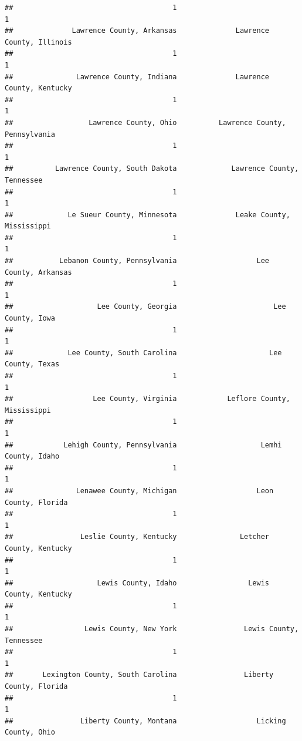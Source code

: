 \documentclass[
]{article}
\begin{document}
\begin{verbatim}
##                                      1                                      1 
##              Lawrence County, Arkansas              Lawrence County, Illinois 
##                                      1                                      1 
##               Lawrence County, Indiana              Lawrence County, Kentucky 
##                                      1                                      1 
##                  Lawrence County, Ohio          Lawrence County, Pennsylvania 
##                                      1                                      1 
##          Lawrence County, South Dakota             Lawrence County, Tennessee 
##                                      1                                      1 
##             Le Sueur County, Minnesota              Leake County, Mississippi 
##                                      1                                      1 
##           Lebanon County, Pennsylvania                   Lee County, Arkansas 
##                                      1                                      1 
##                    Lee County, Georgia                       Lee County, Iowa 
##                                      1                                      1 
##             Lee County, South Carolina                      Lee County, Texas 
##                                      1                                      1 
##                   Lee County, Virginia            Leflore County, Mississippi 
##                                      1                                      1 
##            Lehigh County, Pennsylvania                    Lemhi County, Idaho 
##                                      1                                      1 
##               Lenawee County, Michigan                   Leon County, Florida 
##                                      1                                      1 
##                Leslie County, Kentucky               Letcher County, Kentucky 
##                                      1                                      1 
##                    Lewis County, Idaho                 Lewis County, Kentucky 
##                                      1                                      1 
##                 Lewis County, New York                Lewis County, Tennessee 
##                                      1                                      1 
##       Lexington County, South Carolina                Liberty County, Florida 
##                                      1                                      1 
##                Liberty County, Montana                   Licking County, Ohio 

\end{verbatim}
\end{document}

